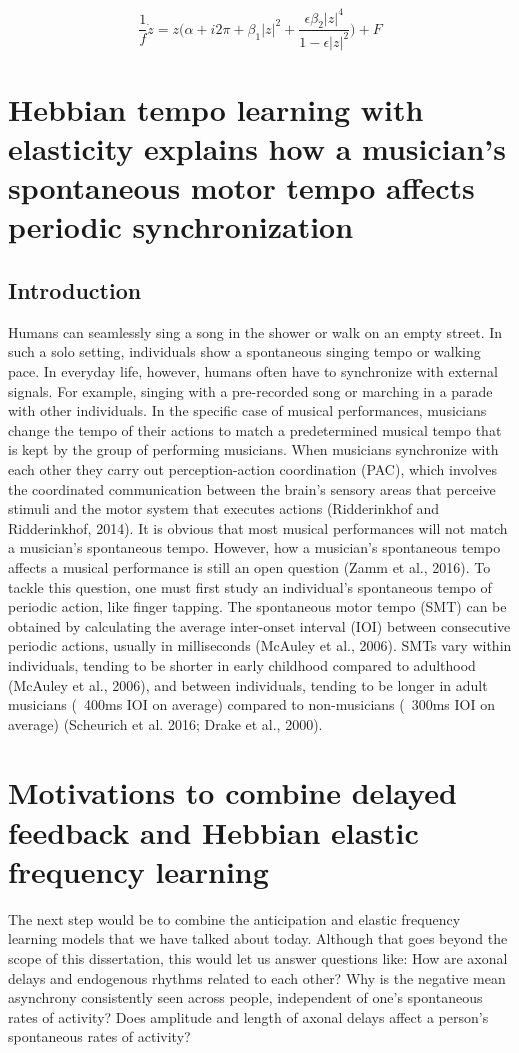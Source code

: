 \documentclass{report}
\begin{document}
\begin{equation}
\frac{1}{f}\dot{z} = z\bigg(\alpha + i2\pi + \beta_1|z|^2 + \frac{\epsilon\beta_2|z|^4}{1-\epsilon|z|^2}\bigg) + F \label{eq:2.4}
\end{equation}


\chapter{Hebbian tempo learning with elasticity explains how a musician's spontaneous motor tempo affects periodic synchronization}

\section{Introduction}
Humans can seamlessly sing a song in the shower or walk on an empty street. In such a solo setting, individuals show a spontaneous singing tempo or walking pace. In everyday life, however, humans often have to synchronize with external signals. For example, singing with a pre-recorded song or marching in a parade with other individuals. In the specific case of musical performances, musicians change the tempo of their actions to match a predetermined musical tempo that is kept by the group of performing musicians. When musicians synchronize with each other they carry out perception-action coordination (PAC), which involves the coordinated communication between the brain’s sensory areas that perceive stimuli and the motor system that executes actions (Ridderinkhof and Ridderinkhof, 2014). It is obvious that most musical performances will not match a musician's spontaneous tempo. However, how a musician's spontaneous tempo affects a musical performance is still an open question (Zamm et al., 2016). To tackle this question, one must first study an individual’s spontaneous tempo of periodic action, like finger tapping. The spontaneous motor tempo (SMT) can be obtained by calculating the average inter-onset interval (IOI) between consecutive periodic actions, usually in milliseconds (McAuley et al., 2006). SMTs vary within individuals, tending to be shorter in early childhood compared to adulthood (McAuley et al., 2006), and between individuals, tending to be longer in adult musicians (~400ms IOI on average) compared to non-musicians (~300ms IOI on average) (Scheurich et al. 2016; Drake et al., 2000).

\chapter{Motivations to combine delayed feedback and Hebbian elastic frequency learning}
The next step would be to combine the anticipation and elastic frequency learning models that we have talked about today. Although that goes beyond the scope of this dissertation, this would let us answer questions like: How are axonal delays and endogenous rhythms related to each other? Why is the negative mean asynchrony consistently seen across people, independent of one’s spontaneous rates of activity? Does amplitude and length of axonal delays affect a person’s spontaneous rates of activity?
\end{document}
